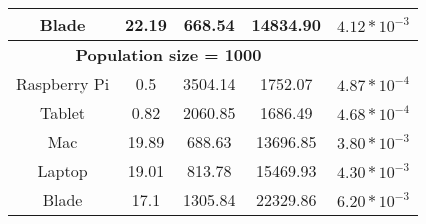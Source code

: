 \begin{small}
\begin{table}[!ht]
\begin{tabular}{ccccc}
Blade & 22.19 & 668.54 & 14834.90 & $4.12*10^{-3}$ \\ \hline
\multicolumn{4}{c}{\textbf{Population size = 1000}}\\ %
Raspberry Pi & 0.5 & 3504.14 & 1752.07 & $4.87*10^{-4}$ \\
Tablet & 0.82 & 2060.85 & 1686.49 & $4.68*10^{-4}$ \\
Mac & 19.89 & 688.63 & 13696.85 & $3.80*10^{-3}$ \\
Laptop & 19.01 & 813.78 & 15469.93 & $4.30*10^{-3}$ \\
Blade &	17.1 & 1305.84 & 22329.86 & $6.20*10^{-3}$ \\ \hline

\end{tabular}
\end{table} 
\end{small}



